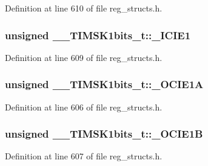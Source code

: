 Definition at line 610 of file reg\+\_\+structs.\+h.

\hypertarget{union_____t_i_m_s_k1bits__t_a0ff35531832f1bc4b27070b090630bf4}{
\subsubsection[{\+\_\+\+I\+C\+I\+E1}]{\setlength{\rightskip}{0pt plus 5cm}unsigned \+\_\+\+\_\+\+T\+I\+M\+S\+K1bits\+\_\+t\+::\+\_\+\+I\+C\+I\+E1}}\label{union_____t_i_m_s_k1bits__t_a0ff35531832f1bc4b27070b090630bf4}


Definition at line 609 of file reg\+\_\+structs.\+h.

\hypertarget{union_____t_i_m_s_k1bits__t_adf1319ad94e6ebc2dc04ebe9235b44bd}{
\subsubsection[{\+\_\+\+O\+C\+I\+E1\+A}]{\setlength{\rightskip}{0pt plus 5cm}unsigned \+\_\+\+\_\+\+T\+I\+M\+S\+K1bits\+\_\+t\+::\+\_\+\+O\+C\+I\+E1\+A}}\label{union_____t_i_m_s_k1bits__t_adf1319ad94e6ebc2dc04ebe9235b44bd}


Definition at line 606 of file reg\+\_\+structs.\+h.

\hypertarget{union_____t_i_m_s_k1bits__t_a389e5a78166c37ede561268b9a143471}{
\subsubsection[{\+\_\+\+O\+C\+I\+E1\+B}]{\setlength{\rightskip}{0pt plus 5cm}unsigned \+\_\+\+\_\+\+T\+I\+M\+S\+K1bits\+\_\+t\+::\+\_\+\+O\+C\+I\+E1\+B}}\label{union_____t_i_m_s_k1bits__t_a389e5a78166c37ede561268b9a143471}


Definition at line 607 of file reg\+\_\+structs.\+h.

